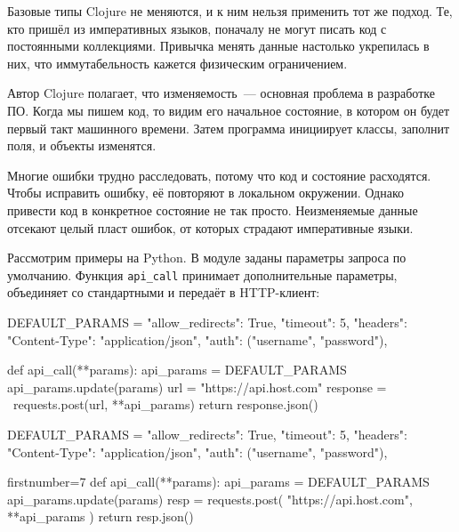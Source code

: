 Базовые типы Clojure не меняются, и к ним нельзя применить тот же подход. Те,
кто пришёл из императивных языков, поначалу не могут писать код с постоянными
коллекциями. Привычка менять данные настолько укрепилась в них, что
иммутабельность кажется физическим ограничением.

Автор Clojure полагает, что изменяемость~--- основная проблема в разработке
ПО. Когда мы пишем код, то видим его начальное состояние, в котором он будет
первый такт машинного времени. Затем программа инициирует классы, заполнит поля,
и объекты изменятся.

Многие ошибки трудно расследовать, потому что код и состояние расходятся. Чтобы
исправить ошибку, её повторяют в локальном окружении. Однако привести код в
конкретное состояние не так просто. Неизменяемые данные отсекают целый пласт
ошибок, от которых страдают императивные языки.


Рассмотрим примеры на Python. В модуле заданы параметры запроса по
умолчанию. Функция \verb|api_call| принимает дополнительные параметры,
объединяет со стандартными и передаёт в HTTP-клиент:

\ifnarrow

\begin{english}
  \begin{python/lines}
DEFAULT_PARAMS = {
    "allow_redirects": True,
    "timeout": 5,
    "headers": {"Content-Type":
                "application/json"},
    "auth": ("username", "password"),
}

def api_call(**params):
    api_params = DEFAULT_PARAMS
    api_params.update(params)
    url = "https://api.host.com"
    response = \
      requests.post(url, **api_params)
    return response.json()
  \end{python/lines}
\end{english}

\else

\begin{english}
  \begin{python/lines}
DEFAULT_PARAMS = {
    "allow_redirects": True,
    "timeout": 5,
    "headers": {"Content-Type": "application/json"},
    "auth": ("username", "password"),
}
  \end{python/lines}
\end{english}

\iflarge\pagebreak[4]\fi
\ifafive\pagebreak[4]\fi

\begin{english}
  \begin{python/lines*}{firstnumber=7}
def api_call(**params):
    api_params = DEFAULT_PARAMS
    api_params.update(params)
    resp = requests.post(
        "https://api.host.com", **api_params
    )
    return resp.json()
  \end{python/lines*}
\end{english}

